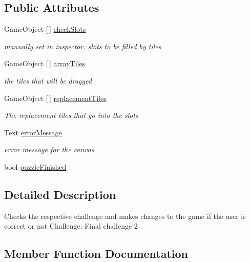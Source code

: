 \subsection*{Public Attributes}
\begin{DoxyCompactItemize}
\item 
Game\+Object \mbox{[}$\,$\mbox{]} \hyperlink{class_final_puzzle_completion_check_afeeb6c56f30c0f636803891a7dd3f53a}{check\+Slots}
\begin{DoxyCompactList}\small\item\em manually set in inspector, slots to be filled by tiles \end{DoxyCompactList}\item 
Game\+Object \mbox{[}$\,$\mbox{]} \hyperlink{class_final_puzzle_completion_check_ab25b67e68be39b9459b6b0f6aa8429b9}{array\+Tiles}
\begin{DoxyCompactList}\small\item\em the tiles that will be dragged \end{DoxyCompactList}\item 
Game\+Object \mbox{[}$\,$\mbox{]} \hyperlink{class_final_puzzle_completion_check_a778ec2e2631b81862469ef127e2799db}{replacement\+Tiles}
\begin{DoxyCompactList}\small\item\em The replacement tiles that go into the slots \end{DoxyCompactList}\item 
Text \hyperlink{class_final_puzzle_completion_check_adf7b1db99726b1744800ff53f9fd32dd}{error\+Message}
\begin{DoxyCompactList}\small\item\em error message for the canvas \end{DoxyCompactList}\item 
bool \hyperlink{class_final_puzzle_completion_check_ad5b37fa48358e0e302c312e015875b4d}{puzzle\+Finished}
\end{DoxyCompactItemize}


\subsection{Detailed Description}
Checks the respective challenge and makes changes to the game if the user is correct or not Challenge\+: Final challenge 2 

\subsection{Member Function Documentation}
\mbox{\label{class_final_puzzle_completion_check_a2cd4702593ffbf8357cc0eddf24f553e}} 
